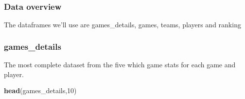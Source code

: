 \documentclass[
]{article}
\newenvironment{Shaded}{\begin{snugshade}}{\end{snugshade}}
\newcommand{\DecValTok}[1]{\textcolor[rgb]{0.00,0.00,0.81}{#1}}
\newcommand{\KeywordTok}[1]{\textcolor[rgb]{0.13,0.29,0.53}{\textbf{#1}}}
\newcommand{\NormalTok}[1]{#1}
\begin{document}
\hypertarget{data-overview}{%
\subsubsection{Data overview}\label{data-overview}}

The dataframes we'll use are games\_details, games, teams, players and
ranking

\hypertarget{games_details}{%
\subsubsection{games\_details}\label{games_details}}

The most complete dataset from the five which game stats for each game
and player.

\begin{Shaded}
\begin{Highlighting}[]
\KeywordTok{head}\NormalTok{(games\_details,}\DecValTok{10}\NormalTok{)}
\end{Highlighting}
\end{Shaded}
\end{document}
